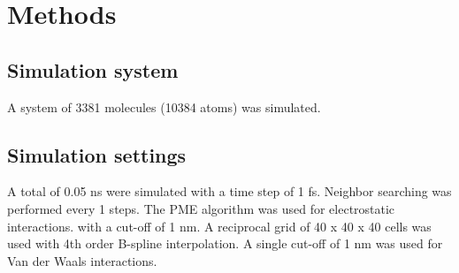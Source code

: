 \section{Methods}
\subsection{Simulation system}
A system of 3381 molecules (10384 atoms) was simulated.

\subsection{Simulation settings}
A total of 0.05 ns were simulated with a time step of 1 fs.
Neighbor searching was performed every 1 steps.
The PME algorithm was used for electrostatic interactions.
with a cut-off of 1 nm.
A reciprocal grid of 40 x 40 x 40 cells was used with 4th order B-spline interpolation.
A single cut-off of 1 nm was used for Van der Waals interactions.
